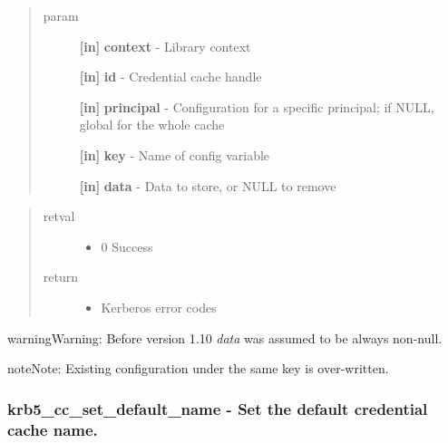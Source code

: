 \documentclass[letterpaper,10pt,english]{sphinxmanual}
\begin{document}
\begin{quote}\begin{description}
\item[{param}] \leavevmode
\textbf{{[}in{]}} \textbf{context} - Library context

\textbf{{[}in{]}} \textbf{id} - Credential cache handle

\textbf{{[}in{]}} \textbf{principal} - Configuration for a specific principal; if NULL, global for the whole cache

\textbf{{[}in{]}} \textbf{key} - Name of config variable

\textbf{{[}in{]}} \textbf{data} - Data to store, or NULL to remove

\end{description}\end{quote}
\begin{quote}\begin{description}
\item[{retval}] \leavevmode\begin{itemize}
\item {} 
0   Success

\end{itemize}

\item[{return}] \leavevmode\begin{itemize}
\item {} 
Kerberos error codes

\end{itemize}

\end{description}\end{quote}

\begin{notice}{warning}{Warning:}
Before version 1.10 \emph{data} was assumed to be always non-null.
\end{notice}

\begin{notice}{note}{Note:}
Existing configuration under the same key is over-written.
\end{notice}


\subsubsection{krb5\_cc\_set\_default\_name -  Set the default credential cache name.}
\label{appdev/refs/api/krb5_cc_set_default_name:krb5-cc-set-default-name-set-the-default-credential-cache-name}\label{appdev/refs/api/krb5_cc_set_default_name::doc}
\end{document}
